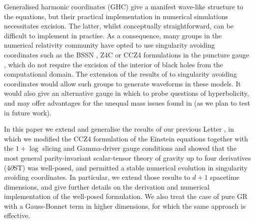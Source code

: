 \documentclass[reprint,aps,amsmath,amssymb,twoside,prd,showkeys,superscriptaddress,nofootinbib]{revtex4-2}
\begin{document}
Generalised harmonic coordinates (GHC) give a manifest wave-like structure to the equations, but their practical implementation in numerical simulations necessitates excision. The latter, whilst conceptually straightforward, can be difficult to implement in practise. As a consequence,  many groups in the numerical relativity community have opted to use singularity avoiding coordinates such as the BSSN \cite{Nakamura:1987zz,Shibata:1995we,Baumgarte:1998te}, Z4C \cite{Bona:2003fj,Bernuzzi:2009ex} or CCZ4 \cite{Alic:2011gg,Alic:2013xsa} formulations in the puncture gauge \cite{Campanelli:2005dd,Baker:2005vv}, which do not require the excision of the interior of black holes from the computational domain. The extension of the results of \cite{Kovacs:2020pns,Kovacs:2020ywu} to singularity avoiding coordinates would allow such groups to generate waveforms in these models. It would also give an alternative gauge in which to probe questions of hyperbolicity, and may offer advantages for the unequal mass issues found in \cite{Corman:2022xqg} (as we plan to test in future work).

In this paper we extend and generalise the results of our previous Letter \cite{short_paper}, in which we modified the CCZ4 formulation of the Einstein equations together with the $1+\log$ slicing \cite{Bona:1994dr} and Gamma-driver \cite{Alcubierre:2002kk} gauge conditions and showed that the most general parity-invariant scalar-tensor theory of gravity up to four derivatives (4$\partial$ST) was well-posed, and permitted a stable numerical evolution in singularity avoiding coordinates.
In particular, we extend those results to $d+1$ spacetime dimensions, and give further details on the derivation and numerical implementation of the well-posed formulation. We also treat the case of pure GR with a Gauss-Bonnet term in higher dimensions, for which the same approach is effective.
\end{document}
